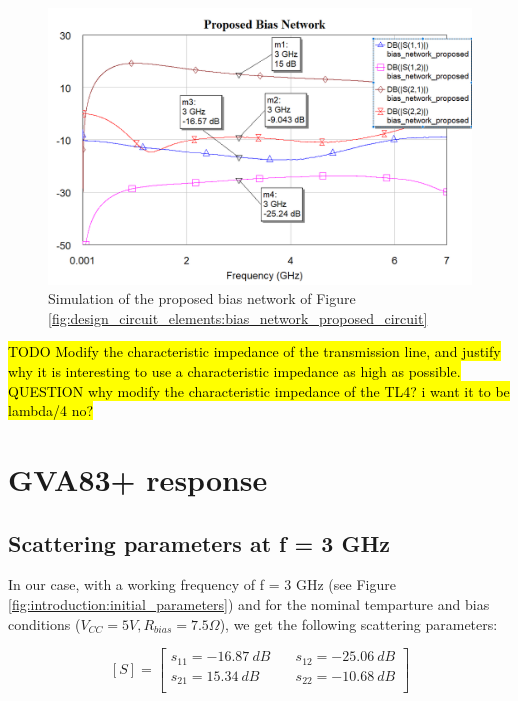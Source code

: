 \documentclass[12pt]{report} %
\newcommand{\question}[1]{\sethlcolor{red}\hl{QUESTION #1}}
\newcommand{\todo}[1]{\sethlcolor{green}\hl{TODO #1}}
\begin{document}
\begin{figure}[htbp]
    \centering
    \includegraphics[width=1\linewidth]{images//design_circuit_elements/bias_network_proposed_graph.png}
    \caption{Simulation of the proposed bias network of Figure \ref{fig:design_circuit_elements:bias_network_proposed_circuit}}
    \label{fig:design_circuit_elements:bias_network_proposed_graph}
\end{figure}

\todo{Modify the characteristic impedance of the transmission line, and justify why it is interesting to use a characteristic impedance as high as possible.}
\question{ why modify the characteristic impedance of the TL4? i want it to be lambda/4 no?}

\section{GVA83+ response}
 
\subsection{Scattering parameters at f = 3 GHz}

In our case, with a working frequency of f = 3 GHz (see Figure \ref{fig:introduction:initial_parameters}) and for the nominal temparture and bias conditions ($V_{CC} = 5V, R_{bias} = 7.5 \Omega$), we get the following scattering parameters:

\[
[S] = \begin{bmatrix}
s_{11} = -16.87 \ dB & \quad s_{12} = -25.06 \ dB \\
s_{21} = 15.34 \ dB & \quad s_{22} = -10.68 \ dB \\
\end{bmatrix}
\]
\end{document}
